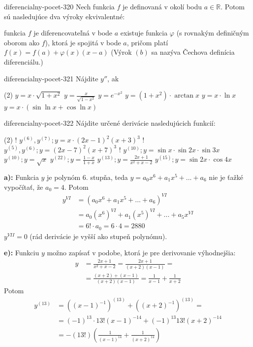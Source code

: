 \begin{defproblem}{diferencialny-pocet-320}
Nech funkcia $f$ je definovaná v okolí bodu $a\in\mathbb{R}$. Potom sú
nasledujúce dva výroky ekvivalentné:
\begin{tasks}
\task
  funkcia $f$ je diferencovateľná v bode $a$
\task
  existuje funkcia $\varphi$ (s rovnakým definičným oborom ako $f$), ktorá je
  spojitá v bode $a$, pričom platí $f(x)=f(a)+\varphi(x)(x-a)$
  (Výrok $(b)$ sa nazýva Čechova definícia diferenciálu.)
\end{tasks}
\end{defproblem}

\begin{defproblem}{diferencialny-pocet-321}
Nájdite $y''$, ak
\begin{tasks}(2)
  \task $y=x\cdot \sqrt{1+x^2}$
  \task $y=\frac{x}{\sqrt{1-x^2}}$
  \task $y=e^{-x^2}$
  \task $y=(1+x^2)\cdot \arctan x$
  \task $y=x\cdot \ln x$
  \task $y=x\cdot(\sin \ln x+\cos \ln x)$
\end{tasks}
\end{defproblem}

\begin{defproblem}{diferencialny-pocet-322}
Nájdite určené derivácie nasledujúcich funkcií:
\begin{tasks}(2)
\task! $y^{(6)},y^{(7)}; y=x\cdot (2x-1)^2(x+3)^3$
\task! $y^{(5)},y^{(6)}; y=(2x-7)^2(x+7)^3$
\task! $y^{(10)}; y=\sin x\cdot \sin 2x \cdot \sin 3x$
\task $y^{(10)}; y=\sqrt{x}$
\task $y^{(22)}; y=\frac{1-x}{1+x}$
\task $y^{(13)}; y=\frac{2x+1}{x^2+x-2}$
\task $y^{(15)}; y=\sin 2x\cdot\cos 4x$
\end{tasks}

\begin{solution}
  \textbf{a):}
  Funkcia $y$ je polynóm $6.$ stupňa, teda $y=a_0x^6+a_1x^5+...+a_6$ nie je
  ťažké vypočítať, že $a_0=4$. Potom
  \begin{align*}
    y^{VI}
    &= (a_0x^6+a_1x^5+...+a_6)^{VI} \\
    &= a_0(x^6)^{VI}+a_1(x^5)^{VI}+...+a_5x^{VI} \\
    &=6! \cdot a_0=6 \cdot 4=2880
  \end{align*}
  $y^{VII}=0$ (rád derivácie je vyšší ako stupeň polynómu).

  \textbf{e):}
  Funkciu $y$ možno zapísať v podobe, ktorá je pre derivovanie výhodnejšia:
  \begin{align*}
    y &= \frac{2x+1}{x^2+x-2}=\frac{2x+1}{(x+2)(x-1)} = \\
    &= \frac{(x+2)+(x-1)}{(x+2)(x-1)}=\frac{1}{x-1}+\frac{1}{x+2}
  \end{align*}
  Potom
  \begin{align*}
    y^{(13)}
      &=((x-1)^{-1})^{(13)}+((x+2)^{-1})^{(13)} = \\
    &=(-1)^{13}\cdot 13!(x-1)^{-14}+(-1)^{13}13!(x+2)^{-14} \\
    &=-(13!)(\frac{1}{(x-1)^{14}}+\frac{1}{(x+2)^{14}})
  \end{align*}

\end{solution}
\end{defproblem}

